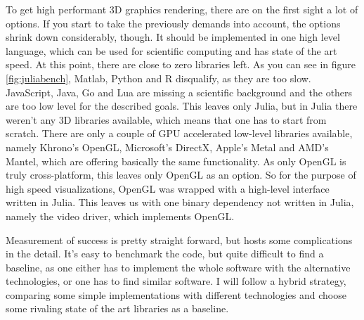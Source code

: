 To get high performant 3D graphics rendering, there are on the first sight a lot of options.
If you start to take the previously demands into account, the options shrink down considerably, though.
It should be implemented in one high level language, which can be used for scientific computing and has state of the art speed. At this point, there are close to zero libraries left. As you can see in figure \ref{fig:juliabench}, Matlab, Python and R disqualify, as they are too slow. JavaScript, Java, Go and Lua are missing a scientific background and the others are too low level for the described goals.
This leaves only Julia, but in Julia there weren't any 3D libraries available, which means that one has to start from scratch.
There are only a couple of GPU accelerated low-level libraries available, namely Khrono's OpenGL, Microsoft's DirectX, Apple's Metal and AMD's Mantel, which are offering basically the same functionality. As only OpenGL is truly cross-platform, this leaves only OpenGL as an option.
So for the purpose of high speed visualizations, OpenGL was wrapped with a high-level interface written in Julia. This leaves us with one binary dependency not written in Julia, namely the video driver, which implements OpenGL.

Measurement of success is pretty straight forward, but hosts some complications in the detail.
It's easy to benchmark the code, but quite difficult to find a baseline, as one either has to implement the whole software with the alternative technologies, or one has to find similar software.
I will follow a hybrid strategy, comparing some simple implementations with different technologies and choose some rivaling state of the art libraries as a baseline.

